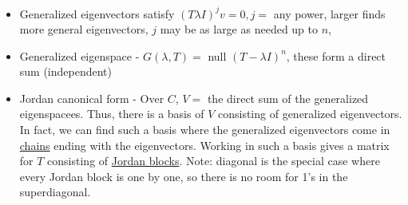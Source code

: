 \documentclass{article}
\begin{document}
\begin{itemize}
    \item Generalized eigenvectors satisfy $(T \lambda I)^j v = 0, j =$ any power, larger finds more general eigenvectors, $j$ may be as large as needed up to $n$, 
    \item Generalized eigenspace - $G(\lambda, T) = $ null $(T - \lambda I)^n$, these form a direct sum (independent)
    \item Jordan canonical form - Over $C$, $V =$ the direct sum of the generalized eigenspacees. Thus, there is a basis of $V$ consisting of generalized eigenvectors. In fact, we can find such a basis where the generalized eigenvectors come in \underline{chains} ending with the eigenvectors. Working in such a basis gives a matrix for $T$ consisting of \underline{Jordan blocks}. Note: diagonal is the special case where every Jordan block is one by one, so there is no room for 1's in the superdiagonal. 
\end{itemize}
\end{document}
